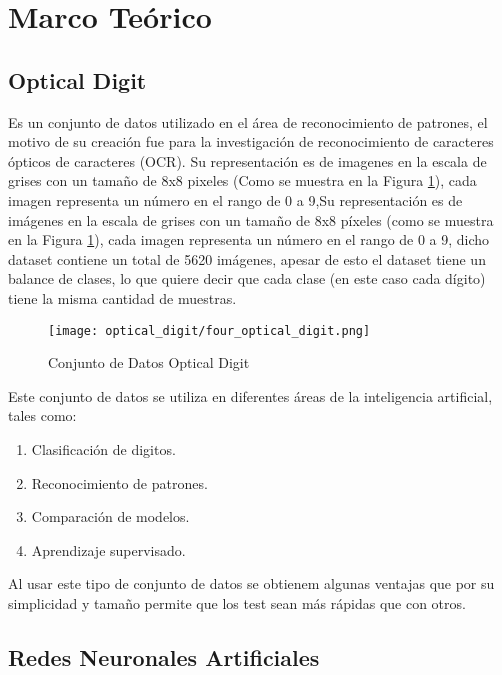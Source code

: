 \section{Marco Teórico}

    \subsection{Optical Digit}

        Es un conjunto de datos utilizado en el área de reconocimiento de patrones, el motivo de su creación fue para la investigación de reconocimiento de caracteres ópticos de caracteres (OCR).
        Su representación es de imagenes en la escala de grises con un tamaño de 8x8 pixeles (Como se muestra en la Figura \ref{fig:optical_digit}), cada imagen representa un número en el rango de 0 a 9,Su representación es de imágenes en la escala de grises con un tamaño de 8x8 píxeles (como se muestra en la Figura \ref{fig:optical_digit}), cada imagen representa un número en el rango de 0 a 9, dicho dataset contiene un total de 5620 imágenes, apesar de esto el dataset tiene un balance de clases, lo que quiere decir que cada clase (en este caso cada dígito) tiene la misma cantidad de muestras.

        \begin{figure}[H]
            \centering
            \texttt{[image: optical\_digit/four\_optical\_digit.png]}
            \caption{Conjunto de Datos Optical Digit}
            \label{fig:optical_digit}
        \end{figure}

        Este conjunto de datos se utiliza en diferentes áreas de la inteligencia artificial, tales como:
        
        \begin{enumerate}
            \item Clasificación de digitos.
            \item Reconocimiento de patrones.
            \item Comparación de modelos. 
            \item Aprendizaje supervisado.
        \end{enumerate}
        Al usar este tipo de conjunto de datos se obtienem algunas ventajas que por su simplicidad y tamaño permite que los test sean más rápidas que con otros.
    \subsection{Redes Neuronales Artificiales}

